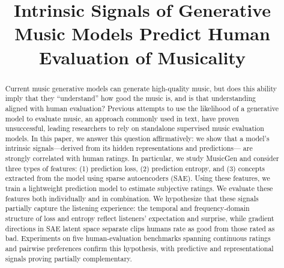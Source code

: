 \documentclass{article}
\title{Intrinsic Signals of Generative Music Models Predict Human Evaluation of Musicality}
\begin{document}
\maketitle

\begin{abstract}
  Current music generative models can generate high-quality music, 
  but does this ability imply that they ``understand'' how good the music is, 
  and is that understanding aligned with human evaluation? 
  Previous attempts to use the likelihood of a generative model to evaluate music, 
  an approach commonly used in text, have proven unsuccessful, 
  leading researchers to rely on standalone supervised music evaluation models. 
  In this paper, we answer this question affirmatively: we show that a model’s 
  intrinsic signals---derived from its hidden representations and predictions---
  are strongly correlated with human ratings. In particular, we study MusicGen and 
  consider three types of features: (1) prediction loss, (2) prediction entropy, and 
  (3) concepts extracted from the model using sparse autoencoders (SAE).
  Using these features, we train a lightweight prediction model to estimate subjective ratings. 
  We evaluate these features both individually and in combination. 
We hypothesize that these signals partially capture the listening experience:
the temporal and frequency-domain structure of loss and entropy
reflect listeners' expectation and surprise,
while gradient directions in SAE latent space
separate clips humans rate as good from those rated as bad.
Experiments on five human-evaluation benchmarks
spanning continuous ratings and pairwise preferences
confirm this hypothesis,
with predictive and representational signals
proving partially complementary.


\end{abstract}
\end{document}
